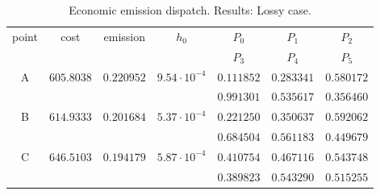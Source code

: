 \begin{table} \centering
\caption{Economic emission dispatch. Results: Lossy case.}
\scriptsize \setlength{\tabcolsep}{0.5em}
\begin{tabular}[c]{ccccccc} \toprule
point & cost & emission & $h_0$  &  $P_0$ & $P_1$ & $P_2$ \\
      &      &          &        &  $P_3$ & $P_4$ & $P_5$ \\ \hline
A & $605.8038$ & $0.220952$ & $9.54\cdot 10^{-4}$  &  $0.111852$ & $0.283341$ & $0.580172$ \\
   &        &        &       &  $0.991301$ & $0.535617$ & $0.356460$ \\
B & $614.9333$ & $0.201684$ & $5.37\cdot 10^{-4}$  &  $0.221250$ & $0.350637$ & $0.592062$ \\
   &        &        &       &  $0.684504$ & $0.561183$ & $0.449679$ \\
C & $646.5103$ & $0.194179$ & $5.87\cdot 10^{-4}$  &  $0.410754$ & $0.467116$ & $0.543748$ \\
   &        &        &       &  $0.389823$ & $0.543290$ & $0.515255$ \\

\bottomrule
\end{tabular}
\label{tab:eedLossy}
\end{table}
